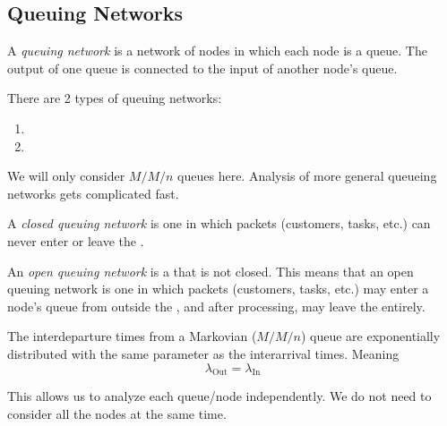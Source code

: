 \subsection{Queuing Networks}\label{subsec:Queuing_Networks}
\begin{definition}\label{def:Queuing_Network}
  A \emph{queuing network} is a network of nodes in which each node is a queue.
  The output of one queue is connected to the input of another node's queue.

  There are 2 types of queuing networks:
  \begin{enumerate}[noitemsep]
  \item {}
  \item {}
  \end{enumerate}

  \begin{remark}\label{rmk:Limiting_Queuing_Networks}
    We will only consider $M/M/n$ queues here.
    Analysis of more general queueing networks gets complicated fast.
  \end{remark}
\end{definition}

\begin{definition}\label{def:Closed_Queuing_Network}
  A \emph{closed queuing network} is one in which packets (customers, tasks, etc.) can never enter or leave the .
\end{definition}

\begin{definition}\label{def:Open_Queuing_Network}
  An \emph{open queuing network} is a  that is not closed.
  This means that an open queuing network is one in which packets (customers, tasks, etc.) may enter a node's queue from outside the , and after processing, may leave the  entirely.
\end{definition}

\begin{theorem}\label{thm:Burkes_Theorem}
  The interdeparture times from a Markovian ($M/M/n$) queue are exponentially distributed with the same parameter as the interarrival times.
  Meaning
  \begin{equation}\label{Burkes_Theorem}
    \lambda_{\mathrm{Out}} = \lambda_{\mathrm{In}}
  \end{equation}

  \begin{remark}
    This allows us to analyze each queue/node independently.
    We do not need to consider all the nodes at the same time.
  \end{remark}
\end{theorem}

